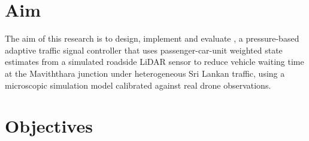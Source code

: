 \section{Aim}\label{sec:intro-aim}

The aim of this research is to design, implement and evaluate \prism{}, a pressure-based adaptive traffic signal controller that uses passenger-car-unit weighted state estimates from a simulated roadside LiDAR sensor to reduce vehicle waiting time at the Maviththara junction under heterogeneous Sri Lankan traffic, using a microscopic simulation model calibrated against real drone observations.

\section{Objectives}\label{sec:intro-objectives}

